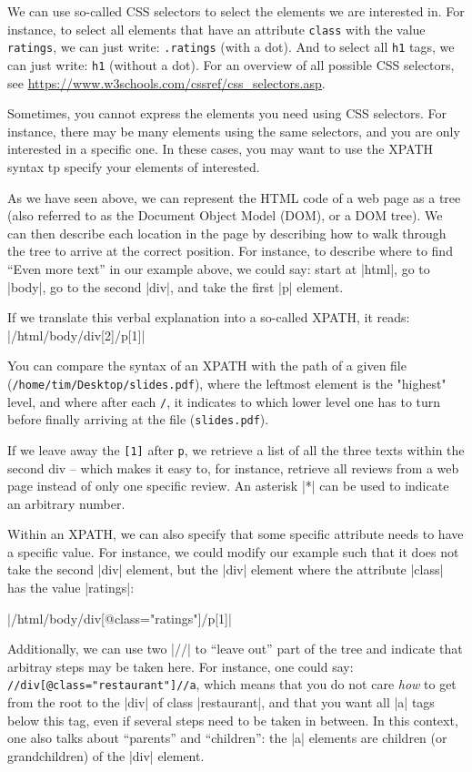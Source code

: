 We can use so-called CSS selectors to select the elements we are
interested in.  For instance, to select all elements that have an
attribute \texttt{class} with the value \texttt{ratings}, we can just
write: \texttt{.ratings} (with a dot).  And to select all \texttt{h1}
tags, we can just write: \texttt{h1} (without a dot).
For an overview of all possible CSS selectors, see
\url{https://www.w3schools.com/cssref/css_selectors.asp}.

Sometimes, you cannot express the elements you need using CSS
selectors. For instance, there may be many elements using the same
selectors, and you are only interested in a specific one. In these
cases, you may want to use the XPATH syntax tp specify your elements
of interested.

As we have seen above, we can represent the HTML code of a web page as
a tree (also referred to as the Document Object Model (DOM), or a DOM
tree). We can then describe each location in the page by describing
how to walk through the tree to arrive at the correct position.  For
instance, to describe where to find ``Even more text'' in our example
above, we could say: start at |html|, go to |body|, go to the second |div|,
and take the first |p| element.

If we translate this verbal explanation into a so-called XPATH, it reads:
|/html/body/div[2]/p[1]|

 You can compare the syntax of an XPATH with the path of a given file
 (\texttt{/home/tim/Desktop/slides.pdf}), where the leftmost element
 is the "highest" level, and where after each \texttt{/}, it indicates
 to which lower level one has to turn before finally arriving at the
 file (\texttt{slides.pdf}).

If we leave away the \texttt{[1]} after \texttt{p}, we retrieve a list
of all the three texts within the second div -- which makes it easy
to, for instance, retrieve all reviews from a web page instead of only
one specific review. An asterisk |*| can be used to indicate an
arbitrary number.

Within an XPATH, we can also specify that some specific attribute
needs to have a specific value. For instance, we could modify our
example such that it does not take the second |div| element, but the
|div| element where the attribute |class| has the value |ratings|:

|/html/body/div[@class="ratings"]/p[1]|

Additionally, we can use two |//| to ``leave out'' part of the tree
and indicate that arbitray steps may be taken here. For instance, one
could say: \texttt{//div[@class="restaurant"]//a}, which means that
you do not care \emph{how} to get from the root to the |div| of class
|restaurant|, and that you want all |a| tags below this tag, even if
several steps need to be taken in between. In this context, one also
talks about ``parents'' and ``children'': the |a| elements are
children (or grandchildren) of the |div| element.


